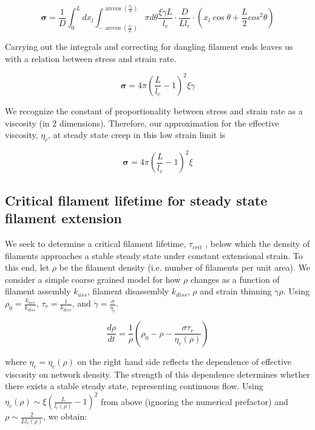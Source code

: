 \documentclass[10pt,letterpaper]{article}
\begin{document}
\begin{equation}
\mathbf{\sigma} =  \frac{1}{D} \int_0^L dx_l \int_{-\arccos (\frac{x_l}{L})}^{\arccos (\frac{x_l}{L})}\pi d\theta \frac{\xi \dot \gamma L}{l_c} \cdot \frac{D}{Ll_c}\cdot (x_l \cos \theta + \frac{L}{2} cos^2\theta)
\end{equation}

Carrying out the integrals and correcting for dangling filament ends leaves us with a relation between stress and strain rate.

\begin{equation}
\mathbf{\sigma} = 4 \pi \left ( \frac{ L}{l_c}-1 \right)^2 \xi \dot \gamma 
\end{equation}

We recognize the constant of proportionality between stress and strain rate as a viscosity (in 2 dimensions).  Therefore, our approximation for the effective viscosity, $\eta_{c}$, at steady state creep in this low strain limit is

\begin{equation}
\label{lin_eqn}
\mathbf{\sigma} = 4 \pi \left ( \frac{ L}{l_c}-1 \right)^2 \xi
\end{equation}



\subsection{Critical filament lifetime for steady state filament extension}
We seek to determine a critical filament lifetime, $\tau_{crit}$ , below which the density of filaments approaches a stable steady state under constant extensional strain. To this end, let $\rho$ be the filament density (i.e. number of filaments per unit area). We consider a simple coarse grained model for how $\rho$ changes as a function of filament assembly $k_{ass}$, filament disassembly $k_{diss}$, $\rho$ and strain thinning $\dot{\gamma}\rho$. Using $\rho_0 = \frac{k_{ass}}{k_{diss}}$, $\tau_r=\frac{1}{k_{diss}}$, and $\dot{\gamma}=\frac{\sigma}{\eta_c}$.

\begin{equation}
\label{drho_1}
\frac{d\rho}{dt}=\frac{1}{\rho}\left ( \rho_0 - \rho - \frac{\sigma \tau_r}{\eta_c(\rho)}\right )
\end{equation}

where $\eta_c = \eta_c(\rho)$ on the right hand side reflects the dependence of effective viscosity on network density.  The strength of this dependence determines whether there exists a stable steady state, representing continuous flow.  Using $\eta_c(\rho)\sim \xi \left ( \frac{L}{l_c(\rho)} -1 \right )^2$ from above (ignoring the numerical prefactor) and $\rho \sim \frac{2}{L l_c(\rho)}$, we obtain:
\end{document}
